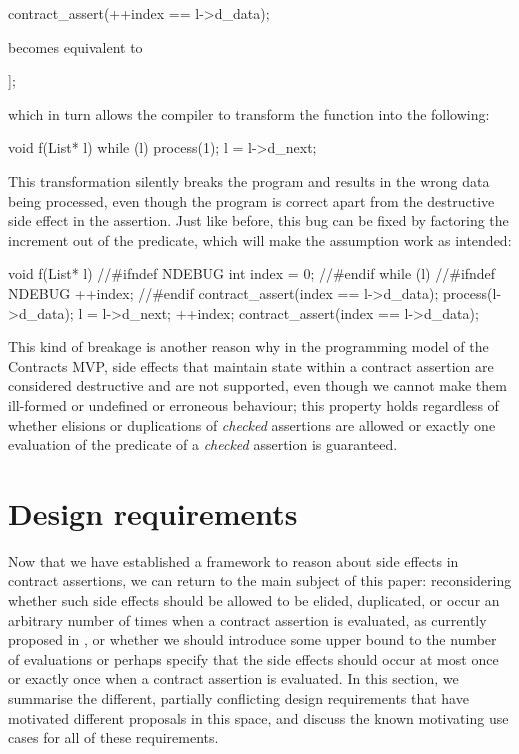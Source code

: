 \begin{codeblock}
contract_assert(++index == l->d_data);
\end{codeblock}
becomes equivalent to
\begin{codeblock}
[[assume(1 == l->d_data)]];
\end{codeblock}
which in turn allows the compiler to transform the function  into the following:
\begin{codeblock}
void f(List* l) {
  while (l) {
    process(1);
    l = l->d_next;
  }
}
\end{codeblock}
This transformation silently breaks the program and results in the wrong data being processed, even though the program is correct apart from the destructive side effect in the assertion. Just like before, this bug can be fixed by factoring the increment out of the predicate, which will make the assumption work as intended:

\begin{codeblock}
void f(List* l) {
//\#ifndef NDEBUG
  int index = 0;
//\#endif
  while (l) {
  //\#ifndef NDEBUG
    ++index;
  //\#endif
    contract_assert(index == l->d_data);
    process(l->d_data);
    l = l->d_next;
  }
}
++index;
contract_assert(index == l->d_data);
\end{codeblock}

This kind of breakage is another reason why in the programming model of the Contracts MVP, side effects that maintain state within a contract assertion are considered destructive and are not supported, even though we cannot make them ill-formed or undefined or erroneous behaviour; this property holds regardless of whether elisions or duplications of \emph{checked} assertions are allowed or exactly one evaluation of the predicate of a \emph{checked} assertion is guaranteed.


\section{Design requirements}
\label{sec:reqs}

Now that we have established a framework to reason about side effects in contract assertions, we can return to the main subject of this paper: reconsidering whether such side effects should be allowed to be elided, duplicated, or occur an arbitrary number of times when a contract assertion is evaluated, as currently proposed in \cite{P2900R6}, or whether we should introduce some upper bound to the number of evaluations or perhaps specify that the side effects should occur at most once or exactly once when a contract assertion is evaluated. In this section, we summarise the different, partially conflicting design requirements that have motivated different proposals in this space, and discuss the known motivating use cases for all of these requirements.

